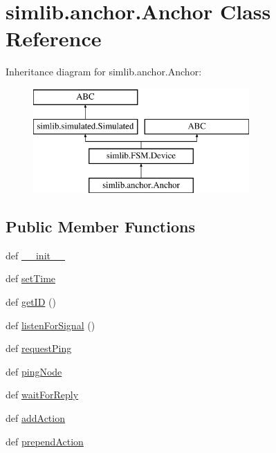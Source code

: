 \hypertarget{classsimlib_1_1anchor_1_1_anchor}{}\section{simlib.\+anchor.\+Anchor Class Reference}
\label{classsimlib_1_1anchor_1_1_anchor}
Inheritance diagram for simlib.\+anchor.\+Anchor\+:\begin{figure}[H]
\begin{center}
\leavevmode
\includegraphics[height=4.000000cm]{classsimlib_1_1anchor_1_1_anchor}
\end{center}
\end{figure}
\subsection*{Public Member Functions}
\begin{DoxyCompactItemize}
\item 
def \mbox{\hyperlink{classsimlib_1_1anchor_1_1_anchor_a7f9c8d88a2b75c6906c7b3c407122253}{\+\_\+\+\_\+init\+\_\+\+\_\+}}
\item 
def \mbox{\hyperlink{classsimlib_1_1anchor_1_1_anchor_a07919385fe2be01caa5b21ecda72994a}{set\+Time}}
\item 
def \mbox{\hyperlink{classsimlib_1_1anchor_1_1_anchor_aad6e8cef879578483a4b76a82719b7bd}{get\+ID}} ()
\item 
def \mbox{\hyperlink{classsimlib_1_1anchor_1_1_anchor_a1bfd4394f56d62e710ed4df8367cb5a3}{listen\+For\+Signal}} ()
\item 
def \mbox{\hyperlink{classsimlib_1_1anchor_1_1_anchor_a99648f62d73c149e1683b829c3e3763c}{request\+Ping}}
\item 
def \mbox{\hyperlink{classsimlib_1_1anchor_1_1_anchor_a7fb5450523f88349670ecaee772996bc}{ping\+Node}}
\item 
def \mbox{\hyperlink{classsimlib_1_1anchor_1_1_anchor_ac9c49d6bb6cb2e736221dde820da32cd}{wait\+For\+Reply}}
\item 
def \mbox{\hyperlink{classsimlib_1_1anchor_1_1_anchor_a4766235728733695b9309020504d646e}{add\+Action}}
\item 
def \mbox{\hyperlink{classsimlib_1_1anchor_1_1_anchor_ad6a0662edca4f31fdb1f2e1ddc3f14f9}{prepend\+Action}}
\end{DoxyCompactItemize}

